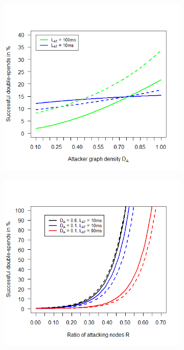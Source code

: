 \documentclass[a4paper,12pt,twoside]{report}
\begin{document}
\begin{figure}
\begin{subfigure}{.495\textwidth}
\end{subfigure}
\begin{subfigure}{.495\textwidth}
  \centering
  \includegraphics[width=\linewidth]{Comparison/AttDensity/attdens.png}
\end{subfigure}%
\begin{subfigure}{.495\textwidth}
  \centering
  \includegraphics[width=\linewidth]{Comparison/AttDensity/attdensrat.png}

\end{subfigure}
\end{figure}
\end{document}
